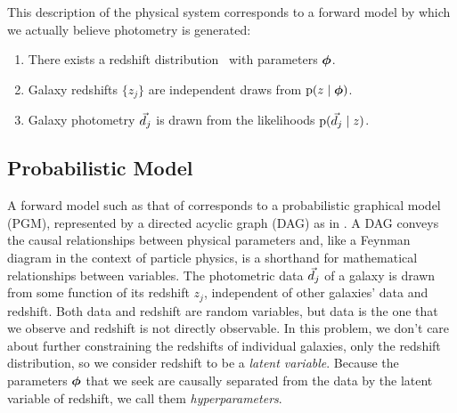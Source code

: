 This description of the physical system corresponds to a forward model by which we actually believe photometry is generated:
\begin{enumerate}
	\item There exists a redshift distribution \nz\ with parameters ${\boldsymbol{\phi}}$.
	\item Galaxy redshifts $\{z_{j}\}$ are independent draws from $\mathrm{p}(z \mid {\ensuremath{\boldsymbol{\phi}}})$.
	\item Galaxy photometry $\vec{d}_{j}$ is drawn from the likelihoods $\mathrm{p}(\vec{d}_{j} \mid z)$.
\end{enumerate}

\subsection{Probabilistic Model}

A forward model such as that of  corresponds to a probabilistic graphical model (PGM), represented by a directed acyclic graph (DAG) as in .
A DAG conveys the causal relationships between physical parameters and, like a Feynman diagram in the context of particle physics, is a shorthand for mathematical relationships between variables.
The photometric data $\vec{d}_{j}$ of a galaxy is drawn from some function of its redshift $z_{j}$, independent of other galaxies' data and redshift.
Both data and redshift are random variables, but data is the one that we observe and redshift is not directly observable.
In this problem, we don't care about further constraining the redshifts of individual galaxies, only the redshift distribution, so we consider redshift to be a \textit{latent variable}.
Because the parameters ${\boldsymbol{\phi}}$ that we seek are causally separated from the data by the latent variable of redshift, we call them \textit{hyperparameters}.

